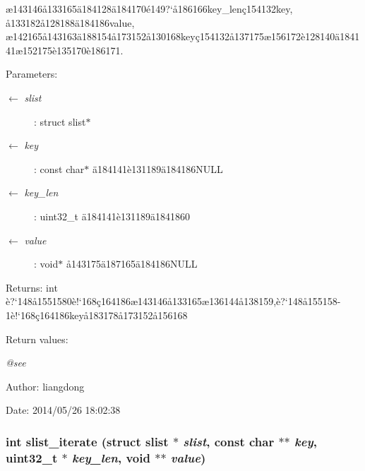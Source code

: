 \ae{}143146\aa{}133165\"{a}184128\"{a}184170\'{e}149?`\aa{}186166key\_\-len\c{c}154132key, \aa{}133182\aa{}128188\"{a}184186value, \ae{}142165\aa{}143163\"{a}188154\aa{}173152\aa{}130168key\c{c}154132\aa{}137175\ae{}156172\`{e}128140\"{a}184141\ae{}152175\`{e}135170\`{e}186171. 

\begin{Desc}
\item[Parameters:]
\begin{description}
\item[\mbox{$\leftarrow$} {\em slist}]: struct slist$\ast$ \item[\mbox{$\leftarrow$} {\em key}]: const char$\ast$ \"{a}184141\`{e}131189\"{a}184186NULL \item[\mbox{$\leftarrow$} {\em key\_\-len}]: uint32\_\-t \"{a}184141\`{e}131189\"{a}1841860 \item[\mbox{$\leftarrow$} {\em value}]: void$\ast$ \aa{}143175\"{a}187165\"{a}184186NULL \end{description}
\end{Desc}
\begin{Desc}
\item[Returns:]int \`{e}?`148\aa{}1551580\`{e}!`168\c{c}164186\ae{}143146\aa{}133165\ae{}136144\aa{}138159,\`{e}?`148\aa{}155158-1\`{e}!`168\c{c}164186key\aa{}183178\aa{}173152\aa{}156168 \end{Desc}
\begin{Desc}
\item[Return values:]
\begin{description}
\item[{\em @see}]\end{description}
\end{Desc}
\begin{Desc}
\item[Author:]liangdong \end{Desc}
\begin{Desc}
\item[Date:]2014/05/26 18:02:38 \end{Desc}
\subsubsection{\setlength{\rightskip}{0pt plus 5cm}int slist\_\-iterate (struct slist $\ast$ {\em slist}, const char $\ast$$\ast$ {\em key}, uint32\_\-t $\ast$ {\em key\_\-len}, void $\ast$$\ast$ {\em value})}\label{slist_8c_a18}


